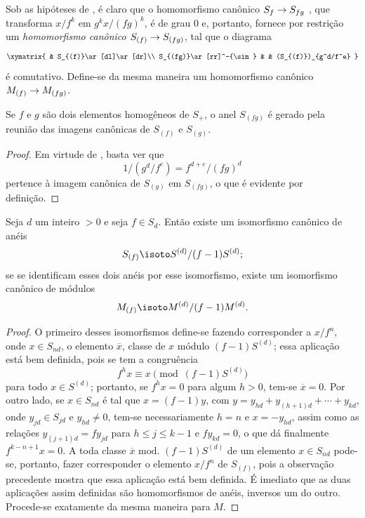 \documentclass[oneside,10pt]{amsart}
\makeatletter
\renewcommand{\leq}{\leqslant}
\newcommand{\ega@arrow}[2]{\mathchoice{#1}{#2}{#2}{#2}}
\renewcommand{\to}{\ega@arrow{\longrightarrow}{\rightarrow}}
\newcommand{\oldpage}[2][]{\marginnote{\normalfont\footnotesize\textbf{#1}~|~#2}\ignorespaces}
\let\EGAOriginalLabel\label
\renewcommand{\label}[1]{\phantomsection\EGAOriginalLabel{#1}}
\makeatother
\begin{document}
\begin{env}[2.2.3]
\label{II.2.2.3}
Sob as hipóteses de , é claro que o homomorfismo canônico $S_f\to S_{fg}$ , que transforma $x/f^k$ em $g^kx/(fg)^k$, é de grau $0$ e, portanto, fornece por restrição um \emph{homomorfismo canônico $S_{(f)}\to S_{(fg)}$}, tal que o diagrama
\[
  \xymatrix{
    & S_{(f)}\ar[dl]\ar[dr]\\
    S_{(fg)}\ar[rr]^-{\sim} & &
    (S_{(f)})_{g^d/f^e}
  }
\]
é comutativo.
Define-se da mesma maneira um homomorfismo canônico $M_{(f)}\to M_{(fg)}$.
\end{env}

\begin{lemma}[2.2.4]
\label{II.2.2.4}
Se $f$ e $g$ são dois elementos homogêneos de $S_+$, o anel $S_{(fg)}$ é gerado pela reunião das imagens canônicas de $S_{(f)}$ e $S_{(g)}$.
\end{lemma}

\begin{proof}
Em virtude de , basta ver que
\[
  1/(g^d/f^e)=f^{d+e}/(fg)^d
\]
pertence à imagem canônica de $S_{(g)}$ em $S_{(fg)}$, o que é evidente por definição.
\end{proof}

\begin{proposition}[2.2.5]
\label{II.2.2.5}
Seja $d$ um inteiro $>0$ e seja $f\in S_d$.
Então existe um isomorfismo canônico de anéis
\[
  S_{(f)}\isoto S^{(d)}/(f-1)S^{(d)};
\]
se se identificam esses dois anéis por esse isomorfismo, existe um isomorfismo canônico de módulos
\[
  M_{(f)}\isoto M^{(d)}/(f-1)M^{(d)}.
\]
\end{proposition}

\begin{proof}
O primeiro desses isomorfismos define-se fazendo corresponder a $x/f^n$, onde $x\in S_{nd}$, o elemento $\overline{x}$, classe de $x$ módulo $(f-1)S^{(d)}$; essa aplicação está bem definida, pois se tem a congruência
\[
  f^hx\equiv x\pmod{(f-1)S^{(d)}}
\]
para todo $x\in S^{(d)}$; portanto, se $f^hx=0$ para algum $h>0$,
\oldpage[II]{25}
tem-se $\overline{x}=0$.
Por outro lado, se $x\in S_{nd}$ é tal que $x=(f-1)y$, com
$y=y_{hd}+y_{(h+1)d}+\cdots+y_{kd}$, onde $y_{jd}\in S_{jd}$ e $y_{hd}\neq0$, tem-se necessariamente $h=n$ e $x=-y_{hd}$, assim como as relações $y_{(j+1)d}=fy_{jd}$ para $h\leq j\leq k-1$ e $fy_{kd}=0$, o que dá finalmente $f^{k-n+1}x=0$.
A toda classe $\overline{x}\text{ mod. }(f-1)S^{(d)}$ de um elemento $x\in S_{nd}$ pode-se, portanto, fazer corresponder o elemento $x/f^n$ de $S_{(f)}$, pois a observação precedente mostra que essa aplicação está bem definida.
É imediato que as duas aplicações assim definidas são homomorfismos de anéis, inversos um do outro.
Procede-se exatamente da mesma maneira para $M$.
\end{proof}
\end{document}
